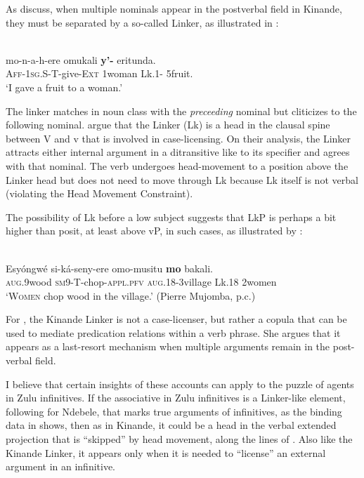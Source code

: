 \documentclass[output=paper,colorlinks,citecolor=brown]{langscibook}
\begin{document}
As \citet{BakerCollins2006} discuss, when multiple nominals appear in the postverbal field in Kinande, they must be separated by a so-called Linker, as illustrated in :

\ea%
    \label{ex:halpert:19}
    \\
    \gll    mo-n-a-h-ere omukali \textbf{y'-} eritunda.\\
            \textsc{Aff-1sg.S-T-}give-\textsc{Ext} 1woman Lk.1- 5fruit.\\
    \glt    `I gave a fruit to a woman.' %
\z 

The linker matches in noun class with the \textit{preceeding} nominal but cliticizes to the following nominal. \citet{BakerCollins2006} argue that the Linker (Lk) is a head in the clausal spine between V and v that is involved in case-licensing.  On their analysis, the Linker attracts either internal argument in a ditransitive like  to its specifier and agrees with that nominal.  The verb undergoes head-movement to a position above the Linker head but does not need to move through Lk  because Lk itself is not verbal (violating the Head Movement Constraint).

The possibility of Lk before a low subject suggests that LkP is perhaps a bit higher than \citet{BakerCollins2006} posit, at least above vP, in such cases, as illustrated by :

\ea%
    \label{ex:halpert:20}
    \\
    \gll    Esy\'ongw\'e si-k\'a-seny-ere omo-musitu \textbf{mo} bakali.\\
            \textsc{aug}.9wood \textsc{sm}9-T-chop-\textsc{appl.pfv} \textsc{aug}.18-3village Lk.18 2women\\
    \glt    `\textsc{Women} chop wood in the village.' (Pierre Mujomba, p.c.)
\z 

For \citet{Schneider-Zioga2015ACAL, Schneider-Zioga2015WCCFL}, the Kinande Linker is not a case-licenser, but rather a copula that can be used to mediate predication relations within a verb phrase.  She argues that it appears as a last-resort mechanism when multiple arguments remain in the post-verbal field.  

I believe that certain insights of these accounts can apply to the puzzle of agents in Zulu infinitives.  If the associative in Zulu infinitives is a Linker-like element, following \citet{Pietraszko2019} for Ndebele, that marks true arguments of infinitives, as the binding data in  shows, then as in Kinande, it could be a head in the verbal extended projection that is ``skipped'' by head movement, along the lines of \citet{BakerCollins2006}. Also like the Kinande Linker, it appears only when it is needed to ``license'' an external argument in an infinitive.
\end{document}

